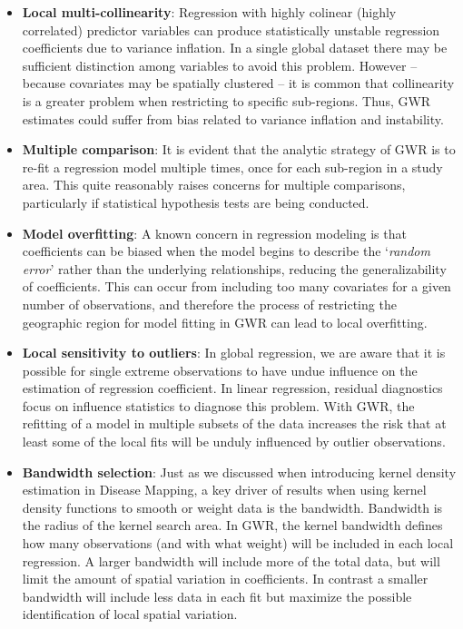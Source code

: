 \documentclass[
]{book}
\providecommand{\tightlist}{%
  \setlength{\itemsep}{0pt}\setlength{\parskip}{0pt}}
\begin{document}
\begin{itemize}
\tightlist
\item
  \textbf{Local multi-collinearity}: Regression with highly colinear (highly correlated) predictor variables can produce statistically unstable regression coefficients due to variance inflation. In a single global dataset there may be sufficient distinction among variables to avoid this problem. However -- because covariates may be spatially clustered -- it is common that collinearity is a greater problem when restricting to specific sub-regions. Thus, GWR estimates could suffer from bias related to variance inflation and instability.
\item
  \textbf{Multiple comparison}: It is evident that the analytic strategy of GWR is to re-fit a regression model multiple times, once for each sub-region in a study area. This quite reasonably raises concerns for multiple comparisons, particularly if statistical hypothesis tests are being conducted.
\item
  \textbf{Model overfitting}: A known concern in regression modeling is that coefficients can be biased when the model begins to describe the `\emph{random error}' rather than the underlying relationships, reducing the generalizability of coefficients. This can occur from including too many covariates for a given number of observations, and therefore the process of restricting the geographic region for model fitting in GWR can lead to local overfitting.
\item
  \textbf{Local sensitivity to outliers}: In global regression, we are aware that it is possible for single extreme observations to have undue influence on the estimation of regression coefficient. In linear regression, residual diagnostics focus on influence statistics to diagnose this problem. With GWR, the refitting of a model in multiple subsets of the data increases the risk that at least some of the local fits will be unduly influenced by outlier observations.
\item
  \textbf{Bandwidth selection}: Just as we discussed when introducing kernel density estimation in Disease Mapping, a key driver of results when using kernel density functions to smooth or weight data is the bandwidth. Bandwidth is the radius of the kernel search area. In GWR, the kernel bandwidth defines how many observations (and with what weight) will be included in each local regression. A larger bandwidth will include more of the total data, but will limit the amount of spatial variation in coefficients. In contrast a smaller bandwidth will include less data in each fit but maximize the possible identification of local spatial variation.
\end{itemize}
\end{document}
